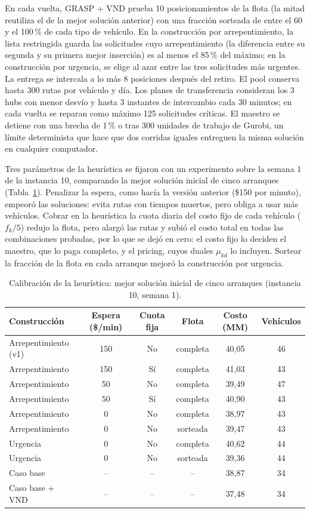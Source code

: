  En cada vuelta, GRASP + VND prueba 10 posicionamientos de la flota (la mitad reutiliza el de la mejor solución anterior) con una fracción sorteada de entre el 60 y el 100\,\% de cada tipo de vehículo. En la construcción por arrepentimiento, la lista restringida guarda las solicitudes cuyo arrepentimiento (la diferencia entre su segunda y su primera mejor inserción) es al menos el 85\,\% del máximo; en la construcción por urgencia, se elige al azar entre las tres solicitudes más urgentes. La entrega se intercala a lo más 8 posiciones después del retiro. El pool conserva hasta 300 rutas por vehículo y día. Los planes de transferencia consideran los 3 hubs con menor desvío y hasta 3 instantes de intercambio cada 30 minutos; en cada vuelta se reparan como máximo 125 solicitudes críticas. El maestro se detiene con una brecha de 1\,\% o tras 300 unidades de trabajo de Gurobi, un límite determinista que hace que dos corridas iguales entreguen la misma solución en cualquier computador.

 Tres parámetros de la heurística se fijaron con un experimento sobre la semana 1 de la instancia 10, comparando la mejor solución inicial de cinco arranques (Tabla~\ref{tab:calibracion}). Penalizar la espera, como hacía la versión anterior (\$150 por minuto), empeoró las soluciones: evita rutas con tiempos muertos, pero obliga a usar más vehículos. Cobrar en la heurística la cuota diaria del costo fijo de cada vehículo ($f_k/5$) redujo la flota, pero alargó las rutas y subió el costo total en todas las combinaciones probadas, por lo que se dejó en cero: el costo fijo lo deciden el maestro, que lo paga completo, y el pricing, cuyos duales $\mu_{kd}$ lo incluyen. Sortear la fracción de la flota en cada arranque mejoró la construcción por urgencia.

\begin{table}[htbp]
\centering
\caption{Calibración de la heurística: mejor solución inicial de cinco arranques (instancia 10, semana 1).}\label{tab:calibracion}
\small
\begin{tabular}{lccccc}
\toprule
Construcción & Espera (\$/min) & Cuota fija & Flota & Costo (MM) & Vehículos \\
\midrule
Arrepentimiento (v1) & 150 & No & completa & 40,05 & 46 \\
Arrepentimiento & 150 & Sí & completa & 41,03 & 43 \\
Arrepentimiento & 50 & No & completa & 39,49 & 47 \\
Arrepentimiento & 50 & Sí & completa & 40,90 & 43 \\
Arrepentimiento & 0 & No & completa & 38,97 & 43 \\
Arrepentimiento & 0 & No & sorteada & 39,47 & 43 \\
Urgencia & 0 & No & completa & 40,62 & 44 \\
Urgencia & 0 & No & sorteada & 39,36 & 44 \\
\midrule
Caso base & -- & -- & -- & 38,87 & 34 \\
Caso base + VND & -- & -- & -- & 37,48 & 34 \\
\bottomrule
\end{tabular}
\end{table}

